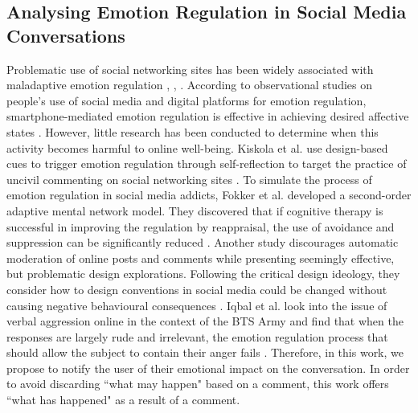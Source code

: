 \subsection{Analysing Emotion Regulation in Social Media Conversations}
Problematic use of social networking sites has been widely associated with maladaptive emotion regulation \cite{yang2020social}, \cite{zsido2021role}, \cite{liu2019adult}. According to observational studies on people's use of social media and digital platforms for emotion regulation, smartphone-mediated emotion regulation is effective in achieving desired affective states \cite{shi2023instant}. However, little research has been conducted to determine when this activity becomes harmful to online well-being. Kiskola et al. use design-based cues to trigger emotion regulation through self-reflection to target the practice of uncivil commenting on social networking sites \cite{kiskola2021applying}. To simulate the process of emotion regulation in social media addicts, Fokker et al. developed a second-order adaptive mental network model. They discovered that if cognitive therapy is successful in improving the regulation by reappraisal, the use of avoidance and suppression can be significantly reduced \cite{fokker2021second}. Another study discourages automatic moderation of online posts and comments while presenting seemingly effective, but problematic design explorations. Following the critical design ideology, they consider how to design conventions in social media could be changed without causing negative behavioural consequences \cite{loizides2020human}. Iqbal et al. look into the issue of verbal aggression online in the context of the BTS Army and find that when the responses are largely rude and irrelevant, the emotion regulation process that should allow the subject to contain their anger fails \cite{iqbal2022emotion}. Therefore, in this work, we propose to notify the user of their emotional impact on the conversation. In order to avoid discarding ``what may happen" based on a comment, this work offers ``what has happened" as a result of a comment.

